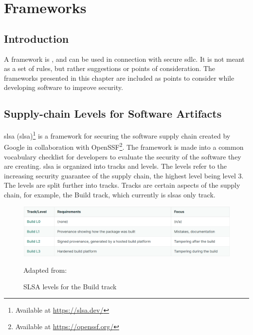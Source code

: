 \section{Frameworks}
\subsection{Introduction}
A framework is \textit{} \cite{FrameworkDefinition}, and can be used in connection with secure \acrshort{sdlc}. It is not meant as a set of rules, but rather suggestions or points of consideration. The frameworks presented in this chapter are included as points to consider while developing software to improve security. 

\subsection{Supply-chain Levels for Software Artifacts}
\acrlong{slsa} (\acrshort{slsa})\footnote{Available at \url{https://slsa.dev/}} is a framework for securing the software supply chain created by Google in collaboration with OpenSSF\footnote{Available at \url{https://openssf.org/}}. The framework is made into a common vocabulary checklist for developers to evaluate the security of the software they are creating. \acrshort{slsa} is organized into tracks and levels. The levels refer to the increasing security guarantee of the supply chain, the highest level being level 3. The levels are split further into tracks. Tracks are certain aspects of the supply chain, for example, the Build track, which currently is \acrshort{slsa}s only track. \cite{SLSAgeneral} 

\vspace{2mm}
\begin{figure}[H]
    \centering
    \includegraphics[width=0.8\columnwidth]{Images/slsalevels.png}
    \caption{SLSA levels for the Build track} Adapted from: \cite{SLSAlevels}
    \label{fig: SLSA levels for the Build track}
\end{figure}

